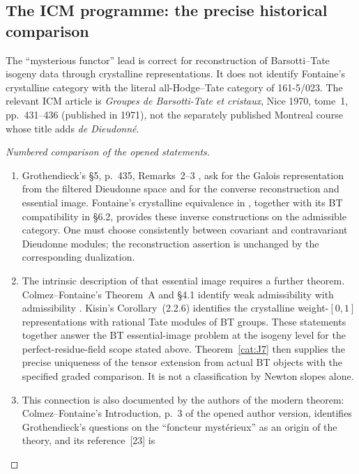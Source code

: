 \subsection{The ICM programme: the precise historical comparison}
\begin{proposition}\label{cat:J9}
The ``mysterious functor'' lead is correct for reconstruction of
Barsotti--Tate isogeny data through crystalline representations.
It does not identify Fontaine's crystalline category with the literal
all-Hodge--Tate category of 161-5/023.
The relevant ICM article is \emph{Groupes de Barsotti-Tate et cristaux},
Nice 1970, tome~1, pp.~431--436 (published in 1971), not the separately
published Montreal course whose title adds \emph{de Dieudonn\'e}.
\end{proposition}
\begin{proof}[Numbered comparison of the opened statements]
\begin{enumerate}
\item Grothendieck's \S5, p.~435, Remarks~2--3
\cite{catGrothendieckICM1970}, ask for the Galois representation from
the filtered Dieudonne space and for the converse reconstruction and
essential image.  Fontaine's crystalline equivalence in
\cite[\S5.2]{catFontaine1982}, together with its BT compatibility
in \S6.2, provides these inverse constructions on the admissible
category.  One must choose consistently between covariant and
contravariant Dieudonne modules; the reconstruction assertion is
unchanged by the corresponding dualization.
\item The intrinsic description of that essential image requires a
further theorem.  Colmez--Fontaine's Theorem~A and \S4.1 identify
weak admissibility with admissibility
\cite{catColmezFontaine2000}.  Kisin's Corollary~(2.2.6)
\cite{catKisin2006} identifies the crystalline weight-$[0,1]$
representations with rational Tate modules of BT groups.  These
statements together answer the BT essential-image problem at the
isogeny level for the perfect-residue-field scope stated above.
Theorem~\ref{cat:J7} then supplies the precise uniqueness of the
tensor extension from actual BT objects with the specified graded
comparison.  It is not a classification by Newton slopes alone.
\item This connection is also documented by the authors of the modern
theorem: Colmez--Fontaine's Introduction, p.~3 of the opened author
version, identifies Grothendieck's questions on the ``foncteur
myst\'erieux'' as an origin of the theory, and its reference~[23] is

\end{enumerate}
\end{proof}
